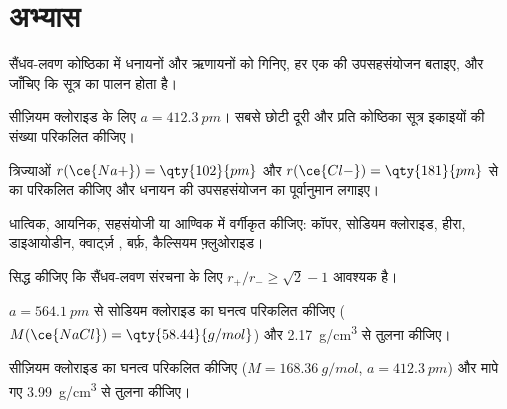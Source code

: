 \section{अभ्यास}

\begin{exercise}[$\star$]\label{exo:b1:crystals-ionic-covalent:1}
सैंधव-लवण कोष्ठिका में धनायनों और ऋणायनों को गिनिए, हर एक की
उपसहसंयोजन बताइए, और जाँचिए कि सूत्र  का पालन होता है।
\end{exercise}

\begin{exercise}[$\star$]\label{exo:b1:crystals-ionic-covalent:2}
सीज़ियम क्लोराइड के लिए $a = \qty{412.3}{pm}$। सबसे छोटी
 दूरी और प्रति कोष्ठिका सूत्र इकाइयों की संख्या परिकलित कीजिए।
\end{exercise}

\begin{exercise}[$\star$]\label{exo:b1:crystals-ionic-covalent:3}
त्रिज्याओं $r(\ce{Na+}) = \qty{102}{pm}$ और $r(\ce{Cl-}) =
\qty{181}{pm}$ से  का  परिकलित कीजिए और
धनायन की उपसहसंयोजन का पूर्वानुमान लगाइए।
\end{exercise}

\begin{exercise}[$\star$]\label{exo:b1:crystals-ionic-covalent:4}
धात्विक, आयनिक, सहसंयोजी या आण्विक में वर्गीकृत कीजिए: कॉपर, सोडियम
क्लोराइड, हीरा, डाइआयोडीन, क्वार्ट्ज़ , बर्फ़, कैल्सियम फ़्लुओराइड।
\end{exercise}

\begin{exercise}[$\star\star$]\label{exo:b1:crystals-ionic-covalent:5}
सिद्ध कीजिए कि सैंधव-लवण संरचना के लिए $r_+/r_- \ge \sqrt2 - 1$ आवश्यक है।
\end{exercise}

\begin{exercise}[$\star\star$]\label{exo:b1:crystals-ionic-covalent:6}
$a = \qty{564.1}{pm}$ से सोडियम क्लोराइड का घनत्व परिकलित कीजिए
($M(\ce{NaCl}) = \qty{58.44}{g/mol}$) और
\qty{2.17}{g/cm^3} से तुलना कीजिए।
\end{exercise}

\begin{exercise}[$\star\star$]\label{exo:b1:crystals-ionic-covalent:7}
सीज़ियम क्लोराइड का घनत्व परिकलित कीजिए ($M = \qty{168.36}{g/mol}$,
$a = \qty{412.3}{pm}$) और मापे गए \qty{3.99}{g/cm^3} से तुलना कीजिए।
\end{exercise}

